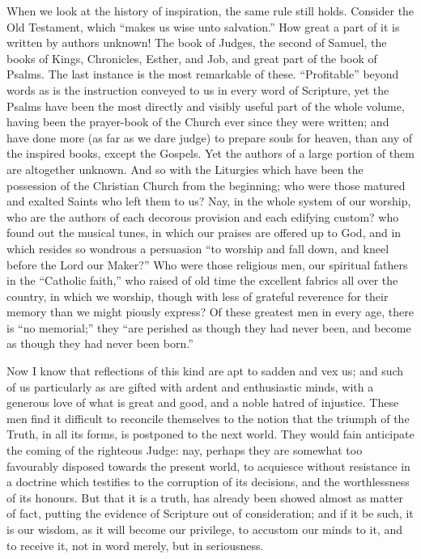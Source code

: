 When we look at the history of inspiration, the same rule still
holds. Consider the Old Testament, which ``makes us wise unto
salvation.'' How great a part of it is written by authors unknown!
The book of Judges, the second of Samuel, the books of Kings,
Chronicles, Esther, and Job, and great part of the book of Psalms. The
last instance is the most remarkable of these. ``Profitable''
beyond words as is the instruction conveyed to us in every word of
Scripture, yet the Psalms have been the most directly and visibly
useful part of the whole volume, having been the prayer-book of the
Church ever since they were written; and have done more (as far as we
dare judge) to prepare souls for heaven, than any of the inspired
books, except the Gospels. Yet the authors of a large portion of them
are altogether unknown. And so with the Liturgies which have been the
possession of the Christian Church from the beginning; who were those
matured and exalted Saints who left them to us? Nay, in the whole
system of our worship, who are the authors of each decorous provision
and each edifying custom? who found out the musical tunes, in which
our praises are offered up to God, and in which resides so wondrous a
persuasion ``to worship and fall down, and kneel before the Lord
our Maker?'' Who were those religious men, our spiritual fathers
in the ``Catholic faith,'' who raised of old time the
excellent fabrics all over the country, in which we worship, though
with less of grateful reverence for their memory than we might piously
express? Of these greatest men in every age, there is ``no
memorial;'' they ``are perished as though they had never been,
and become as though they had never been born.''

Now I know that reflections of this kind are apt to sadden and vex
us; and such of us particularly as are gifted with ardent and
enthusiastic minds, with a generous love of what is great and good,
and a noble hatred of injustice. These men find it difficult to
reconcile themselves to the notion that the triumph of the Truth, in
all its forms, is postponed to the next world. They would fain
anticipate the coming of the righteous Judge: nay, perhaps they are
somewhat too favourably disposed towards the present world, to
acquiesce without resistance in a doctrine which testifies to the
corruption of its decisions, and the worthlessness of its honours. But
that it is a truth, has already been showed almost as matter of fact,
putting the evidence of Scripture out of consideration; and if it be
such, it is our wisdom, as it will become our privilege, to accustom
our minds to it, and to receive it, not in word merely, but in
seriousness.


